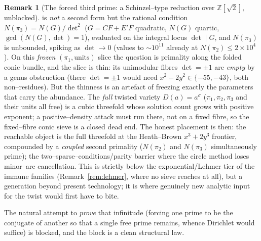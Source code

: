 \documentclass[11pt]{article}
\theoremstyle{definition}
\newtheorem{remark}[theorem]{Remark}
\begin{document}
\begin{remark}[{The forced third prime: a Schinzel--type reduction over $\mathbb{Z}[\sqrt2]$, unblocked}]
is \emph{not} a second form but the rational condition $N(\pi_3)=N(G)/\det^2$ ($G=\bar CF+E'\bar F$ quadratic,
$N(G)$ quartic, $\gcd(N(G),\det)=1$), evaluated on the integral locus $\det\mid G$, and $N(\pi_3)$ is unbounded,
spiking as $\det\to0$ (values to ${\sim}10^{11}$ already at $N(\pi_2)\le2\times10^4$). On this \emph{frozen}
$(\pi_1,\text{units})$ slice the question is primality along the folded conic bundle, and the slice is thin: its
unimodular fibres $\det=\pm1$ are \emph{empty} by a genus obstruction (there $\det=\pm1$ would need
$x^2-2y^2\in\{-55,-43\}$, both non--residues). But the thinness is an artefact of freezing exactly the parameters
that carry the abundance. The \emph{full} twisted variety $D(a)=a^\sigma$ ($\pi_1,\pi_2,\pi_3$ and their units all
free) is a cubic threefold whose solution count grows with positive exponent; a positive--density attack must run
there, not on a fixed fibre, so the fixed--fibre conic sieve is a closed dead end. The honest placement is then: the
reachable object is the full threefold at the Heath--Brown $x^3+2y^3$ frontier, compounded by a \emph{coupled} second
primality ($N(\pi_2)$ and $N(\pi_3)$ simultaneously prime); the two--sparse--conditions/parity barrier where the
circle method loses minor--arc cancellation. This is strictly below the exponential/Lehmer tier of the immune
families (Remark~\ref{rem:lehmer}, where no sieve reaches at all), but a generation beyond present technology; it is
where genuinely new analytic input for the twist would first have to bite.
\end{remark}

The natural attempt to \emph{prove} that infinitude (forcing one prime to be the conjugate of another
so that a single free prime remains, whence Dirichlet would suffice) is blocked, and the block is a
clean structural law.
\end{document}
